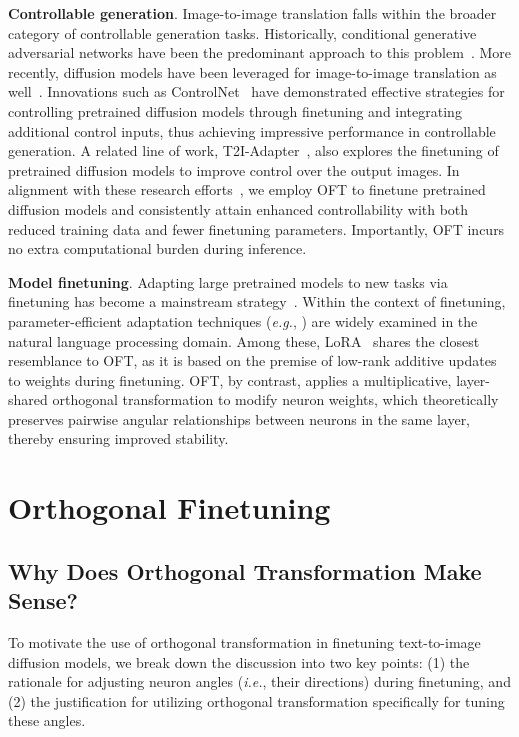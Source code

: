 \textbf{Controllable generation}. Image-to-image translation falls within the broader category of controllable generation tasks. Historically, conditional generative adversarial networks have been the predominant approach to this problem~\cite{isola2017image,zhu2017toward,wang2018high,park2019semantic,choi2018stargan}. More recently, diffusion models have been leveraged for image-to-image translation as well~\cite{saharia2022palette,voynov2022sketch,wang2022pretraining}. Innovations such as ControlNet~\cite{zhang2023adding} have demonstrated effective strategies for controlling pretrained diffusion models through finetuning and integrating additional control inputs, thus achieving impressive performance in controllable generation. A related line of work, T2I-Adapter~\cite{mou2023t2i}, also explores the finetuning of pretrained diffusion models to improve control over the output images. In alignment with these research efforts~\cite{zhang2023adding,mou2023t2i}, we employ OFT to finetune pretrained diffusion models and consistently attain enhanced controllability with both reduced training data and fewer finetuning parameters. Importantly, OFT incurs no extra computational burden during inference.

\textbf{Model finetuning}. Adapting large pretrained models to new tasks via finetuning has become a mainstream strategy~\cite{devlin2018bert,brown2020language,he2022masked}. Within the context of finetuning, parameter-efficient adaptation techniques (\emph{e.g.}, \cite{hulora2022,houlsby2019parameter,pfeiffer2020adapterfusion}) are widely examined in the natural language processing domain. Among these, LoRA~\cite{hulora2022} shares the closest resemblance to OFT, as it is based on the premise of low-rank additive updates to weights during finetuning. OFT, by contrast, applies a multiplicative, layer-shared orthogonal transformation to modify neuron weights, which theoretically preserves pairwise angular relationships between neurons in the same layer, thereby ensuring improved stability.

\section{Orthogonal Finetuning}

\subsection{Why Does Orthogonal Transformation Make Sense?}

To motivate the use of orthogonal transformation in finetuning text-to-image diffusion models, we break down the discussion into two key points: (1) the rationale for adjusting neuron angles (\emph{i.e.}, their directions) during finetuning, and (2) the justification for utilizing orthogonal transformation specifically for tuning these angles.

